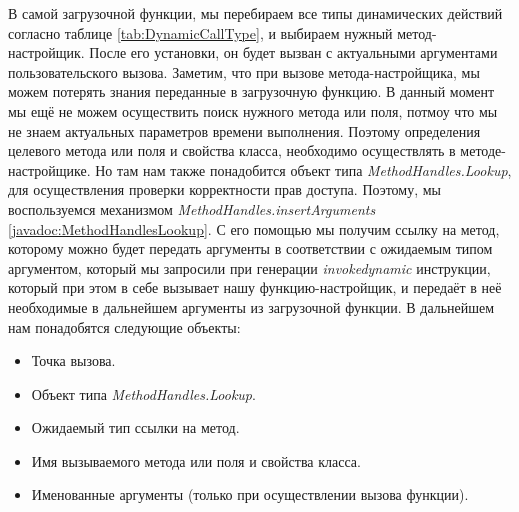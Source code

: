 В самой загрузочной функции, мы перебираем все типы динамических  действий согласно таблице \ref{tab:DynamicCallType}, и выбираем нужный метод-настройщик. После его установки, он будет вызван с актуальными аргументами пользовательского вызова. Заметим, что при вызове метода-настройщика, мы можем потерять знания переданные в загрузочную функцию. В данный момент мы ещё не можем осуществить поиск нужного метода или поля, потмоу что мы не знаем актуальных параметров времени выполнения. Поэтому определения целевого метода или поля и свойства класса, необходимо осуществлять в методе-настройщике. Но там нам также понадобится объект типа \textit{MethodHandles.Lookup}, для осуществления проверки корректности прав доступа. Поэтому, мы воспользуемся механизмом  \textit{MethodHandles.insertArguments} \ref{javadoc:MethodHandlesLookup}. С его помощью мы получим ссылку на метод, которому можно будет передать аргументы в соответствии с ожидаемым типом аргументом, который мы запросили при генерации \textit{invokedynamic} инструкции, который при этом в себе вызывает нашу функцию-настройщик, и передаёт в неё необходимые в дальнейшем аргументы из загрузочной функции. В дальнейшем нам понадобятся следующие объекты:
\begin{itemize}
    \item Точка вызова.
    \item Объект типа \textit{MethodHandles.Lookup}.
    \item Ожидаемый тип ссылки на метод.
    \item Имя вызываемого метода или поля и свойства класса.
    \item Именованные аргументы (только при осуществлении вызова функции).
\end{itemize}
